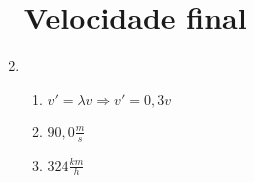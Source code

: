 \documentclass[a4paper]{article}
\begin{document}
\begin{enumerate}

\section{Velocidade final}



\item 
  \begin{enumerate}
  \item $v' = \lambda v \Rightarrow v' = 0,3 v$
  \item $90,0\frac{m}{s}$
  \item $324\frac{km}{h}$
  \end{enumerate}




\end{enumerate}
\end{document}
